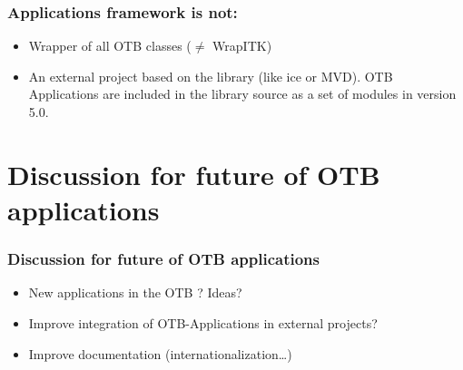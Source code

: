 \documentclass[8pt]{beamer}
\begin{document}
\begin{frame}
\frametitle{Applications framework is not:}
\begin{itemize}
  \item Wrapper of all OTB classes ($\neq$ WrapITK)
  \item An external project based on the library (like ice or MVD). OTB
    Applications are included in the library source as a set of modules in
    version 5.0.
\end{itemize}
\end{frame}

\section{Discussion for future of OTB applications}
\begin{frame}
\frametitle{Discussion for future of OTB applications}
\begin{itemize}
  \item New applications in the OTB ? Ideas?  
  \item Improve integration of OTB-Applications in external projects?
  \item Improve documentation (internationalization\ldots)
\end{itemize}
\end{frame}
\end{document}
